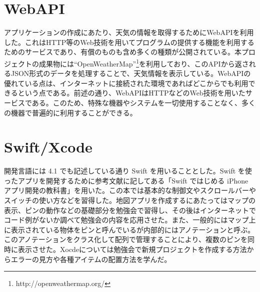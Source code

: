 \documentclass[openany,11pt,papersize]{jsbook}
\begin{document}
\begin{appendix}
\section{WebAPI}
アプリケーションの作成にあたり、天気の情報を取得するためにWebAPIを利用した。これはHTTP等のWeb技術を用いてプログラムの提供する機能を利用するためのサービスであり、有償のものも含め多くの種類が公開されている。本プロジェクトの成果物には``OpenWeatherMap''\footnote{http://openweathermap.org/}を利用しており、このAPIから返されるJSON形式のデータを処理することで、天気情報を表示している。WebAPIの優れている点は、インターネットに接続された環境であればどこからでも利用できるという点である。前述の通り、WebAPIはHTTPなどのWeb技術を用いたサービスである。このため、特殊な機器やシステムを一切使用することなく、多くの機器で普遍的に利用することができる。

\section{Swift/Xcode}
開発言語には 4.1 でも記述している通り Swift を用いることとした。Swift を使ったアプリを開発するために参考文献に記してある「Swift ではじめる iPhone アプリ開発の教科書」を用いた。この本では基本的な制御文やスクロールバーやスイッチの使い方などを習得した。地図アプリを作成するにあたってはマップの表示、ピンの動作などの基礎部分を勉強会で習得し、その後はインターネットでコード例がないか調べて勉強会の内容を応用させた。また、一般的にはマップ上に表示されている物体をピンと呼んでいるが内部的にはアノテーションと呼ぶ。このアノテーションをクラス化して配列で管理することにより、複数のピンを同時に表示させた。Xocdeについては勉強会で新規プロジェクトを作成する方法からエラーの見方や各種アイテムの配置方法を学んだ。


\end{appendix}
\end{document}
